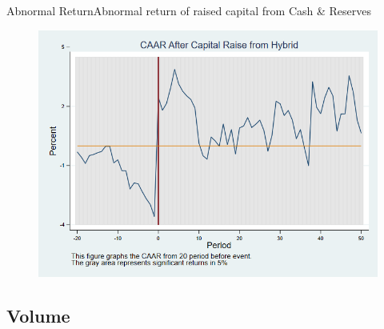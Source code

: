 \documentclass{beamer}
\begin{document}
	\begin{frame}{Abnormal Return}{Abnormal return of raised capital from Cash \& Reserves}
		\label{abreturnhybrid}
		\begin{figure}
			\centering
			\includegraphics[width=0.65\linewidth]{Output/CARHybrid.png}
			\label{fig:abreturnhybrid}
		\end{figure}
		\hfill\hyperlink{abreturnhybrid4Factor}{}
	\end{frame}
	
	
	
	\subsection{Volume}
	
\end{document}
